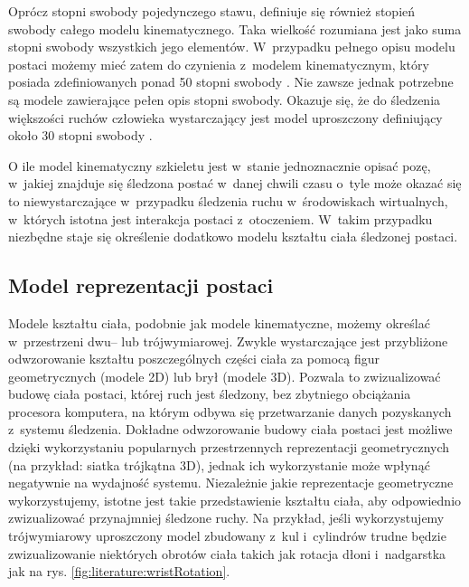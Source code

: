 Oprócz stopni swobody pojedynczego stawu, definiuje się również stopień swobody całego modelu kinematycznego. Taka wielkość rozumiana jest jako suma stopni swobody wszystkich jego elementów. W~przypadku pełnego opisu modelu postaci możemy mieć zatem do czynienia z~modelem kinematycznym, który posiada zdefiniowanych ponad 50 stopni swobody \cite{Agarwal2006}. Nie zawsze jednak potrzebne są modele zawierające pełen opis stopni swobody. Okazuje się, że do śledzenia większości ruchów człowieka wystarczający jest model uproszczony definiujący około 30 stopni swobody \cite{Sigal2006,Kwolek2011}.
													
O ile model kinematyczny szkieletu jest w~stanie jednoznacznie opisać pozę, w~jakiej znajduje się śledzona postać w~danej chwili czasu o~tyle może okazać się to niewystarczające w~przypadku śledzenia ruchu w~środowiskach wirtualnych, w~których istotna jest interakcja postaci z~otoczeniem. W~takim przypadku niezbędne staje się określenie dodatkowo modelu kształtu ciała śledzonej postaci.
															
\subsection{Model reprezentacji postaci}
Modele kształtu ciała, podobnie jak modele kinematyczne, możemy określać w~przestrzeni dwu-- lub trójwymiarowej. Zwykle wystarczające jest przybliżone odwzorowanie kształtu poszczególnych części ciała za pomocą figur geometrycznych (modele 2D) lub brył (modele 3D). Pozwala to zwizualizować budowę ciała postaci, której ruch jest śledzony, bez zbytniego obciążania procesora komputera, na którym odbywa się przetwarzanie danych pozyskanych z~systemu śledzenia. Dokładne odwzorowanie budowy ciała postaci jest możliwe dzięki wykorzystaniu popularnych przestrzennych reprezentacji geometrycznych (na przykład: siatka trójkątna 3D), jednak ich wykorzystanie może wpłynąć negatywnie na wydajność systemu. 
Niezależnie jakie reprezentacje geometryczne wykorzystujemy, istotne jest takie przedstawienie kształtu ciała, aby odpowiednio zwizualizować przynajmniej śledzone ruchy. Na przykład, jeśli wykorzystujemy trójwymiarowy uproszczony model zbudowany z~kul i~cylindrów trudne będzie zwizualizowanie niektórych obrotów ciała takich jak rotacja dłoni i~nadgarstka jak na rys. \ref{fig:literature:wristRotation}.
															
